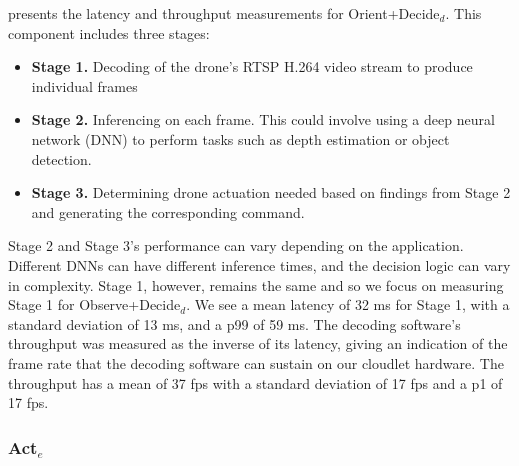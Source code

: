  presents the latency and throughput measurements
for Orient+Decide$_d$. This component includes three stages:

\begin{itemize}
    \item \textbf{Stage 1.} Decoding of the drone's RTSP H.264 video stream to produce
    individual frames
\item \textbf{Stage 2.} Inferencing on each frame. This could involve using a deep
    neural network (DNN) to perform tasks such as depth estimation or object
    detection.
\item \textbf{Stage 3.} Determining drone actuation needed based on findings from Stage
    2 and generating the corresponding command.
\end{itemize}

Stage 2 and Stage 3's performance can vary depending on the application.
Different DNNs can have different inference times, and the decision logic can
vary in complexity.  Stage 1, however, remains the same and so we focus on
measuring Stage 1 for Observe+Decide$_d$. We see a mean latency of 32 ms for
Stage 1, with a standard deviation of 13 ms, and a p99 of 59 ms. The decoding
software's throughput was measured as the inverse of its latency, giving an
indication of the frame rate that the decoding software can sustain on our
cloudlet hardware. The throughput has a mean of 37 fps with a standard
deviation of 17 fps and a p1 of 17 fps.

\subsubsection{\texorpdfstring{Act$_e$}{Act\_e}}

